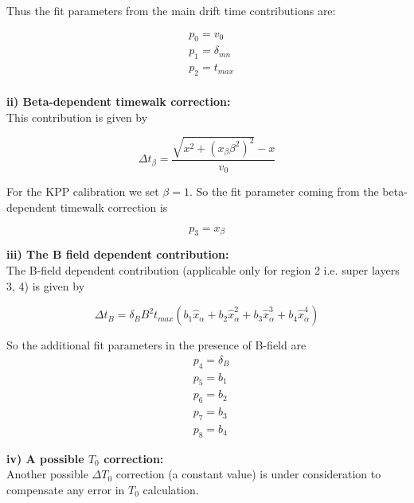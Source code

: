 \documentclass[12pt]{article}
\begin{document}
Thus the fit parameters from the main drift time contributions are:

\begin{equation}\label{}
\begin{split}
& p_0 = v_0\\
& p_1 = \delta_{mn}\\
& p_2 = t_{max} \\
\end{split}
\end{equation}

\textbf{ii) Beta-dependent timewalk correction:}\\
This contribution is given by

\begin{equation}\label{}
\boxed{\Delta t_\beta = \frac{\sqrt{x^2 + (x_\beta \beta^2)^2} - x}{v_0}}
\end{equation}

For the KPP calibration we set $\beta = 1$. So the fit parameter coming from the beta-dependent timewalk correction is

\begin{equation}\label{}
p_3 = x_\beta
\end{equation}

\textbf{iii) The B field dependent contribution:}\\

The B-field dependent contribution (applicable only for region 2 i.e. super layers 3, 4) is given by

\begin{equation}\label{}
\boxed{\Delta t_B = \delta_B B^2 t_{max} (b_1\hat x_\alpha + b_2 \hat x^2_\alpha + b_3\hat x^3_\alpha + b_4\hat x^4_\alpha)}
\end{equation}

So the additional fit parameters in the presence of B-field are
\begin{equation}\label{}
\begin{split}
& p_4 = \delta_B\\
& p_5 = b_1 \\
& p_6 = b_2 \\
& p_7 = b_3 \\
& p_8 = b_4
\end{split}
\end{equation}

\textbf{iv) A possible $T_0$ correction:}\\

Another possible $\Delta T_0$ correction (a constant value) is under consideration to compensate any error in $T_0$ calculation. 
\end{document}
